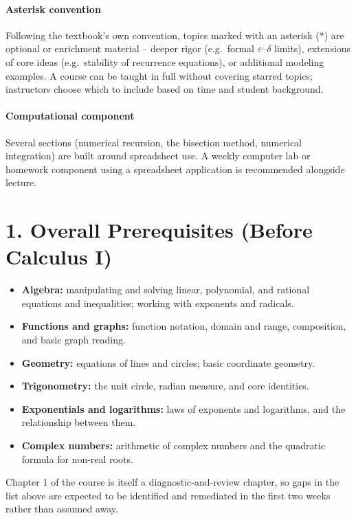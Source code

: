 \documentclass[11pt]{article}
\begin{document}
\paragraph{Asterisk convention} Following the textbook's own convention,
topics marked with an asterisk (*) are optional or enrichment material --
deeper rigor (e.g.\ formal $\varepsilon$--$\delta$ limits), extensions of core
ideas (e.g.\ stability of recurrence equations), or additional modeling
examples. A course can be taught in full without covering starred topics;
instructors choose which to include based on time and student background.

\paragraph{Computational component} Several sections (numerical recursion,
the bisection method, numerical integration) are built around spreadsheet
use. A weekly computer lab or homework component using a spreadsheet
application is recommended alongside lecture.

\section*{1. Overall Prerequisites (Before Calculus I)}

\begin{itemize}
\item \textbf{Algebra:} manipulating and solving linear, polynomial, and
rational equations and inequalities; working with exponents and radicals.
\item \textbf{Functions and graphs:} function notation, domain and range,
composition, and basic graph reading.
\item \textbf{Geometry:} equations of lines and circles; basic coordinate
geometry.
\item \textbf{Trigonometry:} the unit circle, radian measure, and core
identities.
\item \textbf{Exponentials and logarithms:} laws of exponents and logarithms,
and the relationship between them.
\item \textbf{Complex numbers:} arithmetic of complex numbers and the
quadratic formula for non-real roots.
\end{itemize}
Chapter 1 of the course is itself a diagnostic-and-review chapter, so gaps in
the list above are expected to be identified and remediated in the first two
weeks rather than assumed away.
\end{document}
